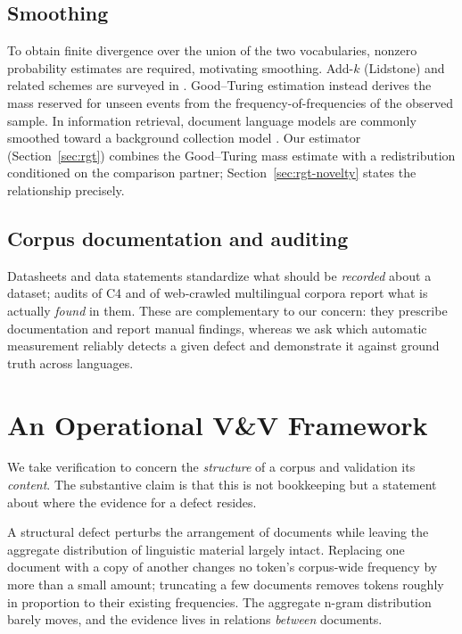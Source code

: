\documentclass[conference]{IEEEtran}
\begin{document}
\subsection{Smoothing}
To obtain finite divergence over the union of the two vocabularies, nonzero probability estimates are required, motivating smoothing. Add-$k$ (Lidstone) and related
schemes are surveyed in \cite{chen1999}. Good--Turing estimation
\cite{good1953,gale1995} instead derives the mass reserved for unseen events from
the frequency-of-frequencies of the observed sample. In information retrieval,
document language models are commonly smoothed toward a background collection
model \cite{zhai2004}. Our estimator (Section~\ref{sec:rgt}) combines the
Good--Turing mass estimate with a redistribution conditioned on the comparison
partner; Section~\ref{sec:rgt-novelty} states the relationship precisely.

\subsection{Corpus documentation and auditing}
Datasheets \cite{gebru2021} and data statements \cite{bender2018} standardize
what should be \emph{recorded} about a dataset; audits of C4 \cite{dodge2021} and
of web-crawled multilingual corpora \cite{kreutzer2022} report what is actually
\emph{found} in them. These are complementary to our concern: they prescribe
documentation and report manual findings, whereas we ask which automatic
measurement reliably detects a given defect and demonstrate it against ground
truth across languages.

\section{An Operational V\&V Framework}
\label{sec:framework}

We take verification to concern the \emph{structure} of a corpus and validation
its \emph{content}. The substantive claim is that this is not bookkeeping but a
statement about where the evidence for a defect resides.

A structural defect perturbs the arrangement of documents while leaving the
aggregate distribution of linguistic material largely intact. Replacing one
document with a copy of another changes no token's corpus-wide frequency by more
than a small amount; truncating a few documents removes tokens roughly in
proportion to their existing frequencies. The aggregate n-gram distribution
barely moves, and the evidence lives in relations \emph{between} documents.
\end{document}
